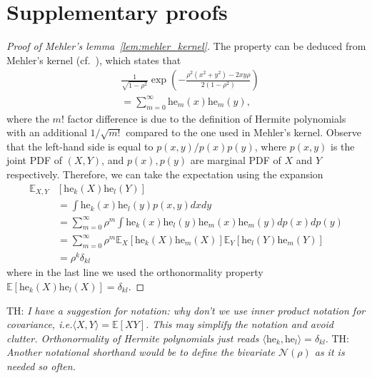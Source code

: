 \documentclass[twoside]{article}
\newcommand{\E}{\mathbb{E}}
\newcommand{\he}{\mathrm{he}}
\theoremstyle{definition}
\newcommand{\thomas}[1]{{\color{blue}TH:  \textit{#1}}}
\begin{document}
\section{Supplementary proofs}
\begin{proof}[Proof of Mehler's lemma~\ref{lem:mehler_kernel}]
The property can be deduced from Mehler's kernel (cf.~\citep{mehler1866ueber}), which states that 
\begin{align*}
&\frac{1}{\sqrt{1-\rho^2}}\exp\left(-\frac{\rho^2(x^2+y^2)-2xy\rho}{2(1-\rho^2)}\right) \\
&= \sum_{m=0}^\infty \he_m(x)\he_m(y),
\end{align*}
where the $m!$ factor difference is due to the definition of Hermite polynomials with an additional $1/\sqrt{m!}$ compared to the one used in Mehler's kernel. 
Observe that the left-hand side is equal to $p(x,y)/p(x)p(y)$, where $p(x,y)$ is the joint PDF of $(X, Y)$, and $p(x),p(y)$ are marginal PDF of $X$ and $Y$ respectively. Therefore, we can take the expectation using the expansion 
\begin{align*}
\E_{X,Y}&\left[ \he_k(X) \he_l(Y)\right] \\
&= \int \he_k(x)\he_l(y)p(x,y)dx dy \\
&=  \sum_{m=0}^\infty \rho^m\int \he_k(x)\he_l(y) \he_m(x)\he_m(y) dp(x)dp(y)\\
&= \sum_{m=0}^\infty \rho^m\E_{X} \left[\he_k(X)\he_m(X)\right]\E_{Y} \left[\he_l(Y)\he_m(Y)\right] \\
&= \rho^k \delta_{kl} 
\end{align*}
where in the last line we used the orthonormality property $\E[\he_k(X) \he_l(X)]=\delta_{kl}$. 
\end{proof}
\thomas{I have a suggestion for notation: why don't we use inner product notation for covariance, i.e.$\langle X,Y \rangle = \E[XY]$. This may simplify the notation and avoid clutter. Orthonormality of Hermite polynomials just reads $\langle \he_k, \he_l \rangle = \delta_{kl}$}. \thomas{Another notational shorthand would be to define the bivariate $\mathcal N(\rho)$ as it is needed so often.}
\end{document}
